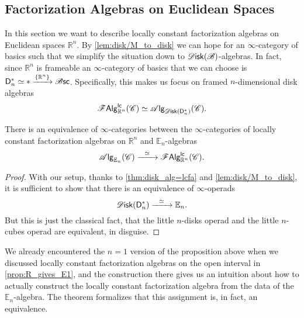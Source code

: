 \documentclass[../text]{subfiles}
\begin{document}
\subsection{Factorization Algebras on Euclidean Spaces}\label{ssec:lcfa_on_Rn}

In this section we want to describe locally constant factorization algebras on Euclidean spaces $\mathbb{R}^n$. By \cref{lem:disk/M_to_disk} we can hope for an $\infty$-category of basics such that we simplify the situation down to $\disk (\bstr)$-algebras. In fact, since $\mathbb{R}^n$ is frameable an $\infty$-category of basics that we can choose is $\mathsf{D}_n^* \simeq * \xrightarrow{\{ \mathbb{R}^n\}} \mathscr{B} \mathsf{sc}$. Specifically, this makes us focus on framed $n$-dimensional disk algebras
%
\begin{equation}
    \lcfa_{\mathbb{R}^n} (\catC) \simeq \alg{\disk (\mathsf{D}_n^*)} (\catC).
\end{equation}
%

\begin{theorem}
    There is an equivalence of $\infty$-categories between the $\infty$-categories of locally constant factorization algebras on $\mathbb{R}^n$ and $\mathbb{E}_n$-algebras
    \begin{equation}
        \alg{\mathbb{E}_n} (\catC) \xrightarrow{\ \ \simeq \ \ } \lcfa_{\mathbb{R}^n} (\catC).
    \end{equation}
\end{theorem}

\begin{proof}
    With our setup, thanks to \cref{thm:disk_alg=lcfa} and \cref{lem:disk/M_to_disk}, it is sufficient to show that there is an equivalence of $\infty$-operads
    \begin{equation}
        \disk (\mathsf{D}_n^*) \xrightarrow{\ \ \simeq \ \ } \mathbb{E}_n.
    \end{equation}
    But this is just the classical fact, that the little $n$-disks operad and the little $n$-cubes operad are equivalent, in disguise.
\end{proof}

\begin{remark}
    We already encountered the $n=1$ version of the proposition above when we discussed locally constant factorization algebras on the open interval in \cref{prop:R_gives_E1}, and the construction there gives us an intuition about how to actually construct the locally constant factorization algebra from the data of the $\mathbb{E}_n$-algebra. The theorem formalizes that this assignment is, in fact, an equivalence.
\end{remark}
\end{document}
